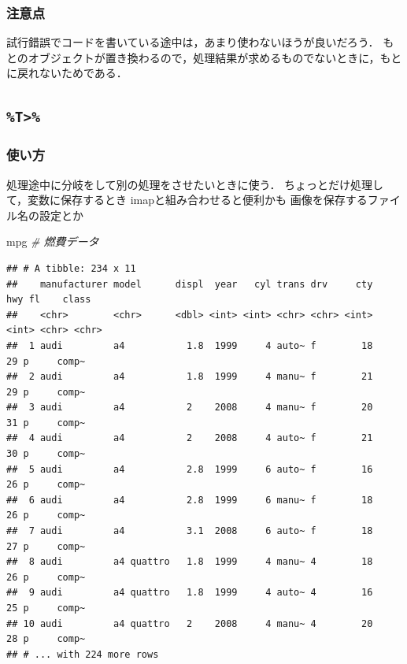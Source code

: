 \documentclass[
]{article}
\newenvironment{Shaded}{\begin{snugshade}}{\end{snugshade}}
\newcommand{\CommentTok}[1]{\textcolor[rgb]{0.56,0.35,0.01}{\textit{#1}}}
\newcommand{\NormalTok}[1]{#1}
\begin{document}
\hypertarget{ux6ce8ux610fux70b9}{%
\subsubsection{注意点}\label{ux6ce8ux610fux70b9}}

試行錯誤でコードを書いている途中は，あまり使わないほうが良いだろう．
もとのオブジェクトが置き換わるので，処理結果が求めるものでないときに，もとに戻れないためである．

\hypertarget{t}{%
\subsection{\texorpdfstring{\texttt{\%T\textgreater{}\%}}{\%T\textgreater\%}}\label{t}}

\hypertarget{ux4f7fux3044ux65b9-1}{%
\subsubsection{使い方}\label{ux4f7fux3044ux65b9-1}}

処理途中に分岐をして別の処理をさせたいときに使う．
ちょっとだけ処理して，変数に保存するとき
imapと組み合わせると便利かも
画像を保存するファイル名の設定とか

\begin{Shaded}
\begin{Highlighting}[]
\NormalTok{mpg }\CommentTok{\# 燃費データ}
\end{Highlighting}
\end{Shaded}

\begin{verbatim}
## # A tibble: 234 x 11
##    manufacturer model      displ  year   cyl trans drv     cty   hwy fl    class
##    <chr>        <chr>      <dbl> <int> <int> <chr> <chr> <int> <int> <chr> <chr>
##  1 audi         a4           1.8  1999     4 auto~ f        18    29 p     comp~
##  2 audi         a4           1.8  1999     4 manu~ f        21    29 p     comp~
##  3 audi         a4           2    2008     4 manu~ f        20    31 p     comp~
##  4 audi         a4           2    2008     4 auto~ f        21    30 p     comp~
##  5 audi         a4           2.8  1999     6 auto~ f        16    26 p     comp~
##  6 audi         a4           2.8  1999     6 manu~ f        18    26 p     comp~
##  7 audi         a4           3.1  2008     6 auto~ f        18    27 p     comp~
##  8 audi         a4 quattro   1.8  1999     4 manu~ 4        18    26 p     comp~
##  9 audi         a4 quattro   1.8  1999     4 auto~ 4        16    25 p     comp~
## 10 audi         a4 quattro   2    2008     4 manu~ 4        20    28 p     comp~
## # ... with 224 more rows
\end{verbatim}
\end{document}

